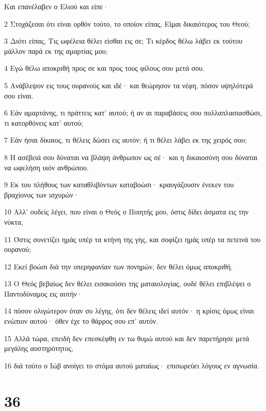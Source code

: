 \par Και επανέλαβεν ο Ελιού και είπε·
\par 2 Στοχάζεσαι ότι είναι ορθόν τούτο, το οποίον είπας, Είμαι δικαιότερος του Θεού;
\par 3 Διότι είπας, Τις ωφέλεια θέλει είσθαι εις σε; Τι κέρδος θέλω λάβει εκ τούτου μάλλον παρά εκ της αμαρτίας μου;
\par 4 Εγώ θέλω αποκριθή προς σε και προς τους φίλους σου μετά σου.
\par 5 Ανάβλεψον εις τους ουρανούς και ιδέ· και θεώρησον τα νέφη, πόσον υψηλότερά σου είναι.
\par 6 Εάν αμαρτάνης, τι πράττεις κατ' αυτού; ή αν αι παραβάσεις σου πολλαπλασιασθώσι, τι κατορθόνεις κατ' αυτού;
\par 7 Εάν ήσαι δίκαιος, τι θέλεις δώσει εις αυτόν; ή τι θέλει λάβει εκ της χειρός σου;
\par 8 Η ασέβειά σου δύναται να βλάψη άνθρωπον ως σέ· και η δικαιοσύνη σου δύναται να ωφελήση υιόν ανθρώπου.
\par 9 Εκ του πλήθους των καταθλιβόντων καταβοώσι· κραυγάζουσιν ένεκεν του βραχίονος των ισχυρών·
\par 10 Αλλ' ουδείς λέγει, που είναι ο Θεός ο Ποιητής μου, όστις δίδει άσματα εις την νύκτα,
\par 11 Όστις συνετίζει ημάς υπέρ τα κτήνη της γης, και σοφίζει ημάς υπέρ τα πετεινά του ουρανού;
\par 12 Εκεί βοώσι διά την υπερηφανίαν των πονηρών, δεν θέλει όμως αποκριθή.
\par 13 Ο Θεός βεβαίως δεν θέλει εισακούσει της ματαιολογίας, ουδέ θέλει επιβλέψει ο Παντοδύναμος εις αυτήν·
\par 14 πόσον ολιγώτερον όταν συ λέγης, ότι δεν θέλεις ιδεί αυτόν· η κρίσις όμως είναι ενώπιον αυτού· όθεν έχε το θάρρος σου επ' αυτόν.
\par 15 Αλλά τώρα, επειδή δεν επεσκέφθη εν τω θυμώ αυτού και δεν παρετήρησε μετά μεγάλης αυστηρότητος,
\par 16 διά τούτο ο Ιώβ ανοίγει το στόμα αυτού ματαίως· επισωρεύει λόγους εν αγνωσία.

\chapter{36}


